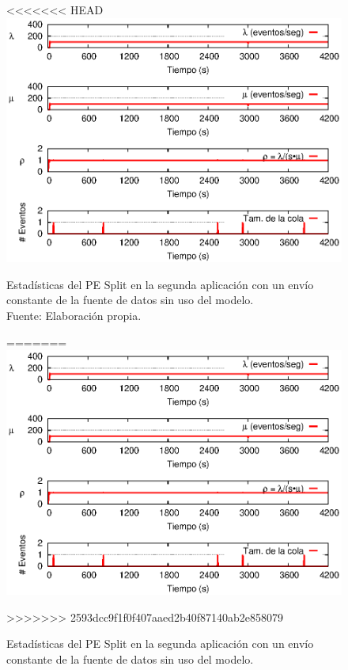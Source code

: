 \begin{figure}[!ht]
<<<<<<< HEAD
    \centering
    \captionsetup{justification=centering}
    \includegraphics[scale=1]{images/exp/app2/uniform/sm/statusSplitPE.eps}
    \caption[Estadísticas del PE Split en la segunda aplicación con un envío constante de la fuente de datos sin uso del modelo.]{Estadísticas del PE Split en la segunda aplicación con un envío constante de la fuente de datos sin uso del modelo.\\Fuente: Elaboración propia.}
=======
\centering
    \includegraphics[scale=1.1]{images/exp/app2/uniform/sm/statusSplitPE.eps}
    \caption{Estad\'isticas del PE Split en la segunda aplicaci\'on con un env\'io constante de la fuente de datos sin uso del modelo.}
>>>>>>> 2593dcc9f1f0f407aaed2b40f87140ab2e858079
    \label{fig:app2-uniform-statusSplitPE-sm}
\end{figure}

